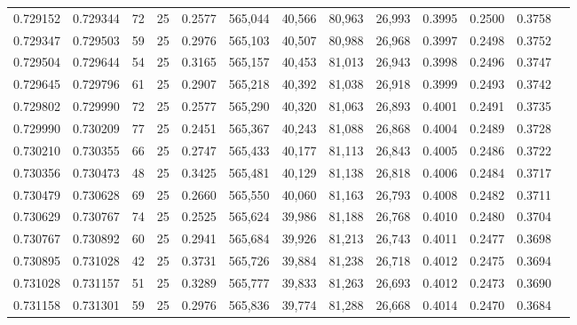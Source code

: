 \begin{tabular}{rrrrrrrrrrrrr}
0.729152 & 0.729344 &    72 &  25 &                                     0.2577 & 565,044 &  40,566 &  80,963 &  26,993 & 0.3995 & 0.2500 & 0.3758 \\
0.729347 & 0.729503 &    59 &  25 &                                     0.2976 & 565,103 &  40,507 &  80,988 &  26,968 & 0.3997 & 0.2498 & 0.3752 \\
0.729504 & 0.729644 &    54 &  25 &                                     0.3165 & 565,157 &  40,453 &  81,013 &  26,943 & 0.3998 & 0.2496 & 0.3747 \\
0.729645 & 0.729796 &    61 &  25 &                                     0.2907 & 565,218 &  40,392 &  81,038 &  26,918 & 0.3999 & 0.2493 & 0.3742 \\
0.729802 & 0.729990 &    72 &  25 &                                     0.2577 & 565,290 &  40,320 &  81,063 &  26,893 & 0.4001 & 0.2491 & 0.3735 \\
0.729990 & 0.730209 &    77 &  25 &                                     0.2451 & 565,367 &  40,243 &  81,088 &  26,868 & 0.4004 & 0.2489 & 0.3728 \\
0.730210 & 0.730355 &    66 &  25 &                                     0.2747 & 565,433 &  40,177 &  81,113 &  26,843 & 0.4005 & 0.2486 & 0.3722 \\
0.730356 & 0.730473 &    48 &  25 &                                     0.3425 & 565,481 &  40,129 &  81,138 &  26,818 & 0.4006 & 0.2484 & 0.3717 \\
0.730479 & 0.730628 &    69 &  25 &                                     0.2660 & 565,550 &  40,060 &  81,163 &  26,793 & 0.4008 & 0.2482 & 0.3711 \\
0.730629 & 0.730767 &    74 &  25 &                                     0.2525 & 565,624 &  39,986 &  81,188 &  26,768 & 0.4010 & 0.2480 & 0.3704 \\
0.730767 & 0.730892 &    60 &  25 &                                     0.2941 & 565,684 &  39,926 &  81,213 &  26,743 & 0.4011 & 0.2477 & 0.3698 \\
0.730895 & 0.731028 &    42 &  25 &                                     0.3731 & 565,726 &  39,884 &  81,238 &  26,718 & 0.4012 & 0.2475 & 0.3694 \\
0.731028 & 0.731157 &    51 &  25 &                                     0.3289 & 565,777 &  39,833 &  81,263 &  26,693 & 0.4012 & 0.2473 & 0.3690 \\
0.731158 & 0.731301 &    59 &  25 &                                     0.2976 & 565,836 &  39,774 &  81,288 &  26,668 & 0.4014 & 0.2470 & 0.3684 \\

\end{tabular}
